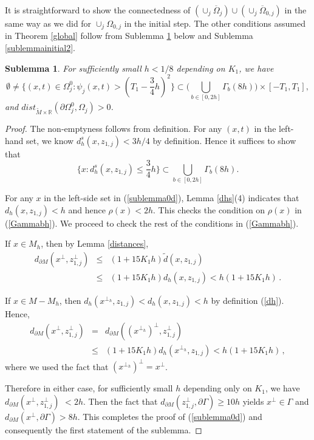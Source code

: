 \documentclass[11pt,letterpaper]{amsart}
\numberwithin{equation}{section}
\theoremstyle{definition}
\theoremstyle{plain}
\theoremstyle{definition}
\theoremstyle{plain}
\newtheorem{sublemma0}[sublemmainitial]{Sublemma}
\theoremstyle{definition}
\theoremstyle{plain}
\begin{document}
It is straightforward to show the connectedness of $(\cup_j \overline{\Omega}_j) \cup (\cup_j\overline{\Omega}_{0,j})$ in the same way as we did for $\cup_j\Omega_{0,j}$ in the initial step. The other conditions assumed in Theorem \ref{global} follow from Sublemma \ref{sublemma0} below and Sublemma \ref{sublemmainitial2}.

\begin{sublemma0}\label{sublemma0}
For sufficiently small $h<1/8$ depending on $K_1$, we have
$$\emptyset\neq \big\{(x,t)\in \Omega_j^0: \psi_j(x,t)>(T_1-\frac{3}{4}h)^2 \big\}\subset \big(\bigcup_{b\in [0,2h]}\Gamma_b(8h)\big)\times [-T_1,T_1],$$
and $dist_{\widetilde{M}\times \mathbb{R}}(\partial \Omega^0_j,\Omega_j)>0$.
\end{sublemma0}
\begin{proof}
The non-emptyness follows from definition. For any $(x,t)$ in the left-hand set, we know $d_h^s(x,z_{1,j})<3h/4$ by definition. Hence it suffices to show that
\begin{equation}\label{sublemma0d}
\big\{x: d_h^s(x,z_{1,j})\leqslant \frac{3}{4}h \big\}\subset \bigcup_{b\in [0,2h]}\Gamma_b(8h).
\end{equation}

For any $x$ in the left-side set in (\ref{sublemma0d}), Lemma \ref{dhs}(4) indicates that $d_h(x,z_{1,j})<h$ and hence $\rho(x)<2h$. This checks the condition on $\rho(x)$ in (\ref{Gammabh}). We proceed to check the rest of the conditions in (\ref{Gammabh}).

If $x\in M_h$, then by Lemma \ref{distances},
\begin{eqnarray*}
d_{\partial M}(x^{\perp},z_{1,j}^{\perp})&\leqslant& (1+15K_1 h)\widetilde{d}(x,z_{1,j}) \\
&\leqslant& (1+15K_1 h)d_h(x,z_{1,j})<h(1+15K_1 h)\, .
\end{eqnarray*}

If $x\in M-M_h$, then $d_h(x^{\perp_h},z_{1,j})<d_h(x,z_{1,j})<h$ by definition (\ref{dh}). Hence,
\begin{eqnarray*}
d_{\partial M}(x^{\perp},z_{1,j}^{\perp}) &=&d_{\partial M}((x^{\perp_h})^{\perp},z_{1,j}^{\perp}) \\
&\leqslant& (1+15K_1 h)d_h(x^{\perp_h},z_{1,j})<h(1+15K_1 h)\, ,
\end{eqnarray*}
where we used the fact that $(x^{\perp_h})^{\perp}=x^{\perp}$.

Therefore in either case, for sufficiently small $h$ depending only on $K_1$, we have $d_{\partial M}(x^{\perp},z_{1,j}^{\perp})$ $<2h$. Then the fact that $d_{\partial M}(z_{1,j}^{\perp},\partial \Gamma)\geqslant 10h$ yields $x^{\perp}\in \Gamma$ and $d_{\partial M}(x^{\perp},\partial \Gamma)> 8h$. This completes the proof of (\ref{sublemma0d}) and consequently the first statement of the sublemma.


\end{proof}
\end{document}
